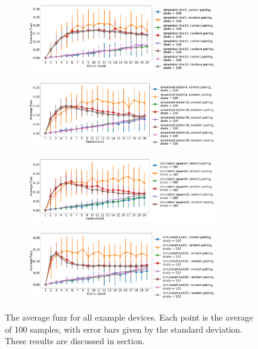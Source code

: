\documentclass[aps,prl,twocolumn,showpacs,preprintnumbers]{revtex4-1}
\begin{document}
\begin{figure}
    \centering
    \begin{subfigure}[b]{\textwidth}
        \includegraphics[width=0.9\textwidth]{figures/line_fuzz.png}
    \end{subfigure}
    \begin{subfigure}[b]{\textwidth}
        \includegraphics[width=0.9\textwidth]{figures/ladder_fuzz.png}
    \end{subfigure}
    \begin{subfigure}[b]{\textwidth}
        \includegraphics[width=0.9\textwidth]{figures/square_fuzz.png}
    \end{subfigure}
    \begin{subfigure}[b]{\textwidth}
        \includegraphics[width=0.9\textwidth]{figures/web_fuzz.png}
    \end{subfigure}
    \caption{The average fuzz for all example devices. Each point is the average of 100 samples, with error bars given by the standard deviation. These results are discussed in section.}\label{fig:example_fuzz}
\end{figure}
\pagebreak
\end{document}
